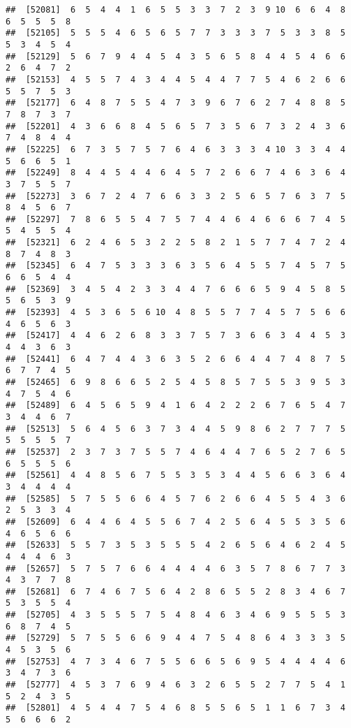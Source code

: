 \documentclass[
]{book}
\begin{document}
\begin{verbatim}
##  [52081]  6  5  4  4  1  6  5  5  3  3  7  2  3  9 10  6  6  4  8  6  5  5  5  8
##  [52105]  5  5  5  4  6  5  6  5  7  7  3  3  3  7  5  3  3  8  5  5  3  4  5  4
##  [52129]  5  6  7  9  4  4  5  4  3  5  6  5  8  4  4  5  4  6  6  2  6  4  7  2
##  [52153]  4  5  5  7  4  3  4  4  5  4  4  7  7  5  4  6  2  6  6  5  5  7  5  3
##  [52177]  6  4  8  7  5  5  4  7  3  9  6  7  6  2  7  4  8  8  5  7  8  7  3  7
##  [52201]  4  3  6  6  8  4  5  6  5  7  3  5  6  7  3  2  4  3  6  7  4  8  4  4
##  [52225]  6  7  3  5  7  5  7  6  4  6  3  3  3  4 10  3  3  4  4  5  6  6  5  1
##  [52249]  8  4  4  5  4  4  6  4  5  7  2  6  6  7  4  6  3  6  4  3  7  5  5  7
##  [52273]  3  6  7  2  4  7  6  6  3  3  2  5  6  5  7  6  3  7  5  8  4  5  6  7
##  [52297]  7  8  6  5  5  4  7  5  7  4  4  6  4  6  6  6  7  4  5  5  4  5  5  4
##  [52321]  6  2  4  6  5  3  2  2  5  8  2  1  5  7  7  4  7  2  4  8  7  4  8  3
##  [52345]  6  4  7  5  3  3  3  6  3  5  6  4  5  5  7  4  5  7  5  6  6  5  4  4
##  [52369]  3  4  5  4  2  3  3  4  4  7  6  6  6  5  9  4  5  8  5  5  6  5  3  9
##  [52393]  4  5  3  6  5  6 10  4  8  5  5  7  7  4  5  7  5  6  6  4  6  5  6  3
##  [52417]  4  4  6  2  6  8  3  3  7  5  7  3  6  6  3  4  4  5  3  4  4  3  6  3
##  [52441]  6  4  7  4  4  3  6  3  5  2  6  6  4  4  7  4  8  7  5  6  7  7  4  5
##  [52465]  6  9  8  6  6  5  2  5  4  5  8  5  7  5  5  3  9  5  3  4  7  5  4  6
##  [52489]  6  4  5  6  5  9  4  1  6  4  2  2  2  6  7  6  5  4  7  3  4  4  6  7
##  [52513]  5  6  4  5  6  3  7  3  4  4  5  9  8  6  2  7  7  7  5  5  5  5  5  7
##  [52537]  2  3  7  3  7  5  5  7  4  6  4  4  7  6  5  2  7  6  5  6  5  5  5  6
##  [52561]  4  4  8  5  6  7  5  5  3  5  3  4  4  5  6  6  3  6  4  3  4  4  4  4
##  [52585]  5  7  5  5  6  6  4  5  7  6  2  6  6  4  5  5  4  3  6  2  5  3  3  4
##  [52609]  6  4  4  6  4  5  5  6  7  4  2  5  6  4  5  5  3  5  6  4  6  5  6  6
##  [52633]  5  5  7  3  5  3  5  5  5  4  2  6  5  6  4  6  2  4  5  4  4  4  6  3
##  [52657]  5  7  5  7  6  6  4  4  4  4  6  3  5  7  8  6  7  7  3  4  3  7  7  8
##  [52681]  6  7  4  6  7  5  6  4  2  8  6  5  5  2  8  3  4  6  7  5  3  5  5  4
##  [52705]  4  3  5  5  5  7  5  4  8  4  6  3  4  6  9  5  5  5  3  6  8  7  4  5
##  [52729]  5  7  5  5  6  6  9  4  4  7  5  4  8  6  4  3  3  3  5  4  5  3  5  6
##  [52753]  4  7  3  4  6  7  5  5  6  6  5  6  9  5  4  4  4  4  6  3  4  7  3  6
##  [52777]  4  5  3  7  6  9  4  6  3  2  6  5  5  2  7  7  5  4  1  5  2  4  3  5
##  [52801]  4  5  4  4  7  5  4  6  8  5  5  6  5  1  1  6  7  3  4  5  6  6  6  2

\end{verbatim}
\end{document}
